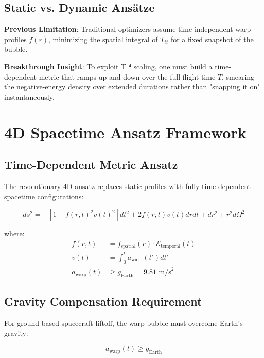 \documentclass[12pt,a4paper]{article}
\begin{document}
\subsection{Static vs. Dynamic Ansätze}

\textbf{Previous Limitation}: Traditional optimizers assume time-independent warp profiles $f(r)$, minimizing the spatial integral of $T_{tt}$ for a fixed snapshot of the bubble.

\textbf{Breakthrough Insight}: To exploit T⁻⁴ scaling, one must build a time-dependent metric that ramps up and down over the full flight time $T$, smearing the negative-energy density over extended durations rather than "snapping it on" instantaneously.

\section{4D Spacetime Ansatz Framework}

\subsection{Time-Dependent Metric Ansatz}

The revolutionary 4D ansatz replaces static profiles with fully time-dependent spacetime configurations:

\begin{equation}
ds^2 = -\left[1 - f(r,t)^2 v(t)^2\right] dt^2 + 2 f(r,t) v(t) dr dt + dr^2 + r^2 d\Omega^2
\end{equation}

where:
\begin{align}
f(r,t) &= f_{\text{spatial}}(r) \cdot \mathcal{E}_{\text{temporal}}(t) \\
v(t) &= \int_0^t a_{\text{warp}}(t') dt' \\
a_{\text{warp}}(t) &\geq g_{\text{Earth}} = 9.81 \text{ m/s}^2
\end{align}

\subsection{Gravity Compensation Requirement}

For ground-based spacecraft liftoff, the warp bubble must overcome Earth's gravity:

\begin{equation}
a_{\text{warp}}(t) \geq g_{\text{Earth}}
\end{equation}
\end{document}
